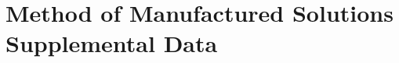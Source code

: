 \documentclass[../doc.tex]{subfiles}
\begin{document}
\chapter{Method of Manufactured Solutions Supplemental Data} \label{chap:mms_data}
\begin{table}
\centering
\caption{}
\label{}
\begin{adjustbox}{max width=\textwidth}

\end{adjustbox}
\end{table}
\begin{table}
\centering
\caption{}
\label{}
\begin{adjustbox}{max width=\textwidth}

\end{adjustbox}
\end{table}
\begin{table}
\centering
\caption{}
\label{}
\begin{adjustbox}{max width=\textwidth}

\end{adjustbox}
\end{table}

\begin{table}
\centering
\caption{}
\label{}
\begin{adjustbox}{max width=\textwidth}

\end{adjustbox}
\end{table}
\begin{table}
\centering
\caption{}
\label{}
\begin{adjustbox}{max width=\textwidth}

\end{adjustbox}
\end{table}
\begin{table}
\centering
\caption{}
\label{}
\begin{adjustbox}{max width=\textwidth}

\end{adjustbox}
\end{table}
\end{document}
